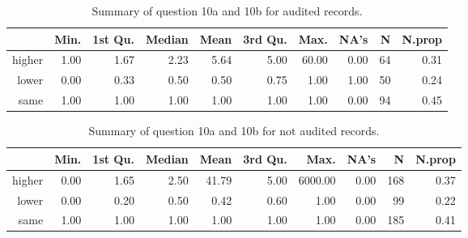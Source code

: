 \begin{table}[ht]
\footnotesize
\centering
\begin{tabular}{rrrrrrrrrr}
  \hline
 & Min. & 1st Qu. & Median & Mean & 3rd Qu. & Max. & NA's & N & N.prop \\ 
  \hline
higher & 1.00 & 1.67 & 2.23 & 5.64 & 5.00 & 60.00 & 0.00 &  64 & 0.31 \\ 
  lower & 0.00 & 0.33 & 0.50 & 0.50 & 0.75 & 1.00 & 1.00 &  50 & 0.24 \\ 
  same & 1.00 & 1.00 & 1.00 & 1.00 & 1.00 & 1.00 & 0.00 &  94 & 0.45 \\ 
   \hline
\end{tabular}
\caption{\label{tab:BC_audited}  Summary of question 10a and 10b for  audited records.}
\end{table}

\begin{table}[ht]
\footnotesize
\centering
\begin{tabular}{rrrrrrrrrr}
  \hline
 & Min. & 1st Qu. & Median & Mean & 3rd Qu. & Max. & NA's & N & N.prop \\ 
  \hline
higher & 0.00 & 1.65 & 2.50 & 41.79 & 5.00 & 6000.00 & 0.00 & 168 & 0.37 \\ 
  lower & 0.00 & 0.20 & 0.50 & 0.42 & 0.60 & 1.00 & 0.00 &  99 & 0.22 \\ 
  same & 1.00 & 1.00 & 1.00 & 1.00 & 1.00 & 1.00 & 0.00 & 185 & 0.41 \\ 
   \hline
\end{tabular}
\caption{\label{tab:BC_not_audited}  Summary of question 10a and 10b for  not audited records.}
\end{table}
